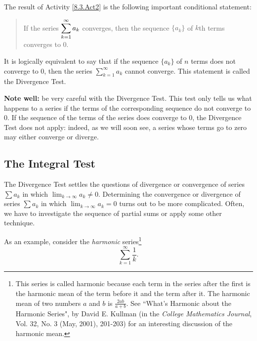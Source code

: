 

The result of Activity \ref{8.3.Act2} is the following important conditional statement: 
\begin{quote}
If the series $\displaystyle \sum_{k = 1}^{\infty} a_k$ converges, then the sequence $\{a_k\}$ of $k$th terms converges to 0.
\end{quote}
It is logically equivalent to say that if the sequence $\{a_k\}$ of $n$ terms does not converge to 0, then the series $ \sum_{k = 1}^{\infty} a_k$ cannot converge. This statement is called the Divergence Test.

\vspace*{5pt}
\nin {}
\vspace*{1pt}




{\bf Note well:} be very careful with the Divergence Test. This test only tells us what happens to a series if the terms of the corresponding sequence do not converge to 0. If the sequence of the terms  of the series does converge to 0, the Divergence Test does not apply:  indeed, as we will soon see, a series whose terms go to zero may either converge or diverge.

\subsection*{The Integral Test}

The Divergence Test settles the questions of divergence or convergence of series $\sum a_k$ in which $\lim_{k \to \infty} a_k \neq 0$.  Determining the convergence or divergence of series $\sum a_k$ in which $\lim_{k \to \infty} a_k = 0$ turns out to be more complicated. Often, we have to investigate the sequence of partial sums or apply some other technique.

As an example, consider the \emph{harmonic} series\footnote{This series is called harmonic because each term in the series after the first is the harmonic mean of the term  before it and the term after it. The harmonic mean of two numbers $a$ and $b$ is $\frac{2ab}{a+b}$. See ``What's Harmonic about the Harmonic Series", by David E. Kullman (in the \emph{College Mathematics Journal}, Vol. 32, No. 3 (May, 2001), 201-203) for an interesting discussion of the harmonic mean.}
\[\sum_{k=1}^{\infty} \frac{1}{k}.\]

